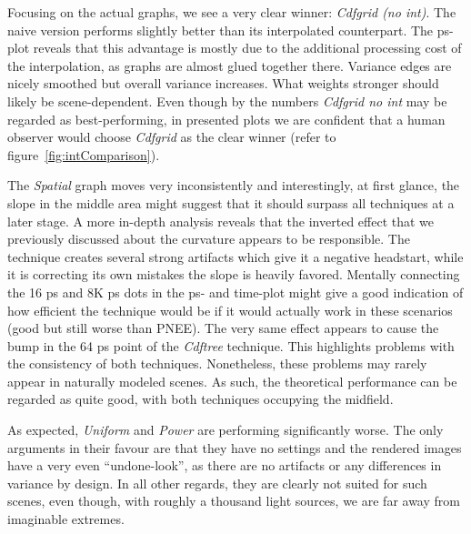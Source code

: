 Focusing on the actual graphs, we see a very clear winner: \textit{Cdfgrid (no int)}. The naive version performs slightly better than its interpolated counterpart. The ps-plot reveals that this advantage is mostly due to the additional processing cost of the interpolation, as graphs are almost glued together there. Variance edges are nicely smoothed but overall variance increases. What weights stronger should likely be scene-dependent. Even though by the numbers \textit{Cdfgrid no int} may be regarded as best-performing, in presented plots we are confident that a human observer would choose \textit{Cdfgrid} as the clear winner (refer to figure~\ref{fig:intComparison}).

The \textit{Spatial} graph moves very inconsistently and interestingly, at first glance, the slope in the middle area might suggest that it should surpass all techniques at a later stage. A more in-depth analysis reveals that the inverted effect that we previously discussed about the curvature appears to be responsible. The technique creates several strong artifacts which give it a negative headstart, while it is correcting its own mistakes the slope is heavily favored. Mentally connecting the 16 ps and 8K ps dots in the ps- and time-plot might give a good indication of how efficient the technique would be if it would actually work in these scenarios (good but still worse than PNEE). The very same effect appears to cause the bump in the 64 ps point of the \textit{Cdftree} technique. This highlights problems with the consistency of both techniques. Nonetheless, these problems may rarely appear in naturally modeled scenes. As such, the theoretical performance can be regarded as quite good, with both techniques occupying the midfield. 

    As expected, \textit{Uniform} and \textit{Power} are performing significantly worse. The only arguments in their favour are that they have no settings and the rendered images have a very even \enquote{undone-look}, as there are no artifacts or any differences in variance by design. In all other regards, they are clearly not suited for such scenes, even though, with roughly a thousand light sources, we are far away from imaginable extremes.

